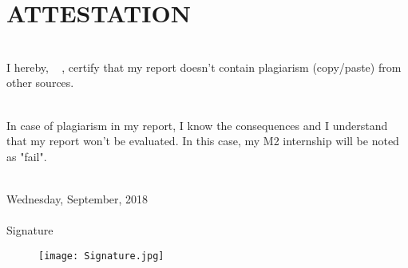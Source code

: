 \chapter*{ATTESTATION}



\vfill


\noindent\hrulefill

~\\


I hereby,  \FirstName~  \LastName, certify that my report doesn't contain plagiarism (copy/paste) from other sources.

~\\

In case of plagiarism in my report, I know the consequences and I understand that my report won't be evaluated. In this case, my M2 internship will be noted as "fail".


~\\

 Wednesday,  September, 2018 \\

~\\
 
 Signature

 \begin{figure}[H]
 \texttt{[image: Signature.jpg]}
 \end{figure}
 ~\\

 \FirstName~  \LastName
 

~\\
~\\
~\\
~\\
~\\

\noindent\hrulefill


\vfill


\vfill


